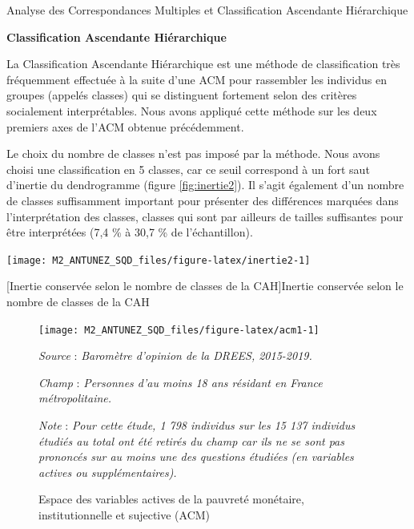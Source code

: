 \documentclass[12pt,a4paper]{reedthesis}
\newcommand{\captiontmp}[2][1]{\captionof{figure}[#1]{#2}}
\begin{document}
\begin{summary_box}[false]{Analyse des Correspondances Multiples et Classification Ascendante Hiérarchique}
\begin{center}
\footnotesize
\normalsize\end{center}

\textbf{Classification Ascendante Hiérarchique}

La Classification Ascendante Hiérarchique est une méthode de classification très fréquemment effectuée à la suite d'une ACM pour rassembler les individus en groupes (appelés classes) qui se distinguent fortement selon des critères socialement interprétables. Nous avons appliqué cette méthode sur les deux premiers axes de l'ACM obtenue précédemment.

Le choix du nombre de classes n'est pas imposé par la méthode. Nous avons choisi une classification en 5 classes, car ce seuil correspond à un fort saut d'inertie du dendrogramme (figure \ref{fig:inertie2}). Il s'agit également d'un nombre de classes suffisamment important pour présenter des différences marquées dans l'interprétation des classes, classes qui sont par ailleurs de tailles suffisantes pour être interprétées (7,4 \% à 30,7 \% de l'échantillon).
\begin{center} \texttt{[image: M2\_ANTUNEZ\_SQD\_files/figure-latex/inertie2-1]}

\captiontmp[Inertie conservée selon le nombre de classes de la CAH]{Inertie conservée selon le nombre de classes de la CAH}\label{fig:inertie2}

\footnotesize
\normalsize\end{center}

\end{summary_box}
\begin{figure}[!ht]

{\centering \texttt{[image: M2\_ANTUNEZ\_SQD\_files/figure-latex/acm1-1]} 

}

\caption[Espace des variables actives de la pauvreté monétaire, institutionnelle et sujective (ACM)]{Espace des variables actives de la pauvreté monétaire, institutionnelle et sujective (ACM)}\label{fig:acm1}

\footnotesize


\emph{Source} : \emph{Baromètre d’opinion de la DREES, 2015-2019.}


\emph{Champ} : \emph{Personnes d’au moins 18 ans résidant en France métropolitaine.}


\emph{Note} : \emph{Pour cette étude, 1 798 individus sur les 15 137 individus étudiés au total ont été retirés du champ car ils ne se sont pas prononcés sur au moins une des questions étudiées (en variables actives ou supplémentaires).}
\normalsize\end{figure}
\end{document}
